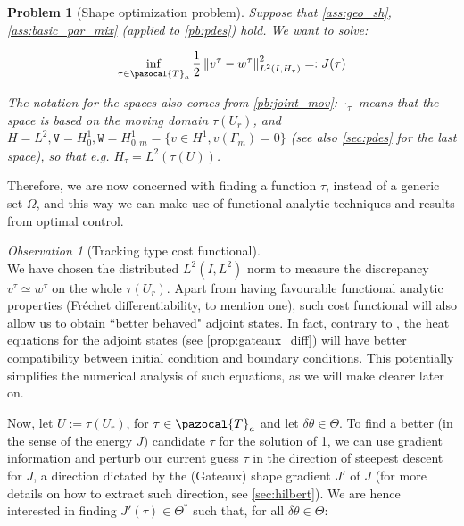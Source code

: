 \documentclass[english,a4paper,10pt,oneside]{scrbook}	%
\theoremstyle{break}
\newtheorem{pb}[equation]{Problem}
\theoremstyle{remark}
\newtheorem{obs}[equation]{Observation}
\newcommand{\norm}[1]{\left\lVert#1\right\rVert}
\newcommand{\cT}{\pazocal{T}}
\newcommand{\te}{\theta}
\newcommand{\Te}{\Theta}
\newcommand{\tw}[1]{\texttt{#1}}
\begin{document}
\begin{pb}[Shape optimization problem]
\label{pb:shopt}
Suppose that \cref{ass:geo_sh}, \cref{ass:basic_par_mix} (applied to \cref{pb:pdes}) hold. We want to solve:

$$\inf_{\tau \in \cT_a}\frac{1}{2}\norm{v^\tau-w^\tau}_{L^2(I,H_\tau)}^2=:J(\tau)$$

The notation for the spaces also comes from  \cref{pb:joint_mov}: $\cdot_\tau$ means that the space is based on the moving domain $\tau(U_r)$, and $H=L^2, \tw{V}=H^1_0, \tw{W} = H^1_{0,m}=\{v \in H^1, v(\Gamma_m)=0\}$ (see also \cref{sec:pdes} for the last space), so that e.g. $H_\tau = L^2(\tau(U))$.

\end{pb}

Therefore, we are now concerned with finding a function $\tau$, instead of a generic set $\Omega$, and this way we can make use of functional analytic techniques and results from optimal control.



\begin{obs}[Tracking type cost functional]
\mbox{}\\
We have chosen the distributed $L^2(I,L^2)$ norm to measure the discrepancy $v^\tau\simeq w^\tau$ on the whole $\tau(U_r)$. Apart from having favourable functional analytic properties (Fréchet differentiability, to mention one), such cost functional will also allow us to obtain ``better behaved" adjoint states. In fact, contrary to \cite{harbrecht}, the heat equations for the adjoint states (see \cref{prop:gateaux_diff}) will have better compatibility between initial condition and boundary conditions. This potentially simplifies the numerical analysis of such equations, as we will make clearer later on.
\end{obs}





Now, let $U:=\tau(U_r)$, for $\tau \in \cT_a$ and let $\delta \te \in \Te$. To find a better (in the sense of the energy $J$) candidate $\tau$ for the solution of \cref{pb:shopt}, we can use gradient information and perturb our current guess $\tau$ in the direction of steepest descent for $J$, a direction dictated by the (Gateaux) shape gradient $J'$ of $J$ (for more details on how to extract such direction, see \cref{sec:hilbert}). We are hence interested in finding $J'(\tau) \in \Te^*$ such that, for all $\delta \te \in \Te$:
\end{document}
